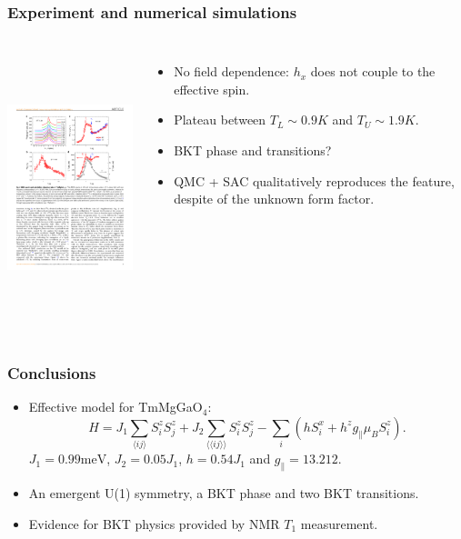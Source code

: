 \documentclass[xcolor=table, aspectratio=1610,ignorenonframetext]{beamer}
\begin{document}
\begin{frame}
  \frametitle{Experiment and numerical simulations}
  \begin{columns}
    \includegraphics[height=8cm]{nmr}
    \begin{itemize}
      \item No field dependence: $h_x$ does not couple to the effective spin.
      \item Plateau between $T_L\sim 0.9K$ and $T_U\sim1.9K$.
      \item BKT phase and transitions?
      \item QMC + SAC qualitatively reproduces the feature, despite of the unknown form factor.
    \end{itemize}
  \end{columns}
\end{frame}

\begin{frame}
  \frametitle{Conclusions}
  \begin{itemize}
    \item Effective model for TmMgGaO${}_4$:
    \[H = J_1\sum_{\langle ij\rangle}S_i^zS_j^z +J_2\sum_{\langle\langle ij\rangle\rangle}S_i^zS_j^z - \sum_i\left(h S_i^x + h^zg_\parallel\mu_BS_i^z\right). \]
    $J_1 = 0.99 \text{meV}$, $J_2 = 0.05J_1$,  $h= 0.54J_1$ and $g_\parallel = 13.212$.
    \item An emergent U(1) symmetry, a BKT phase and two BKT transitions.
    \item Evidence for BKT physics provided by NMR $T_1$ measurement.
  \end{itemize}
\end{frame}
\end{document}
